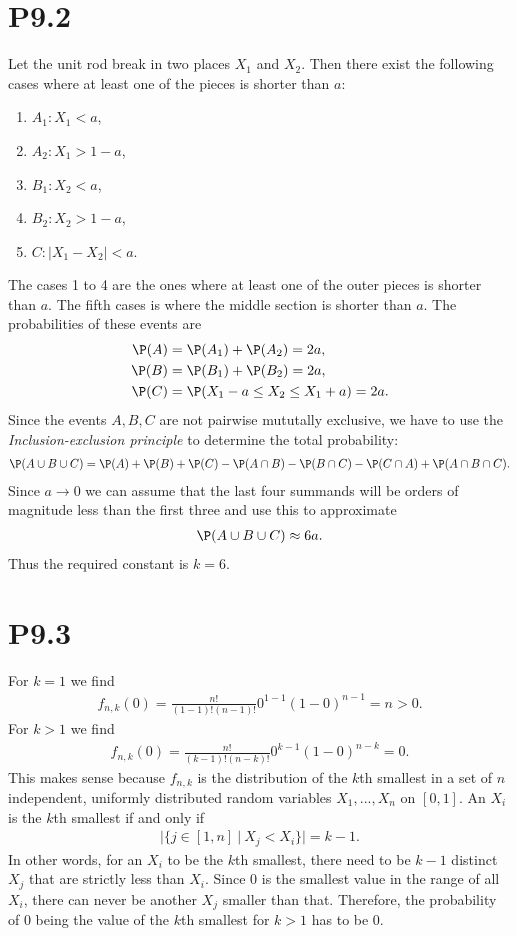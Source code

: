 \documentclass{article}
\begin{document}
\section*{P9.2}

Let the unit rod break in two places $X_1$ and $X_2$. Then there
exist the following cases where at least one of the pieces is shorter
than $a$:
\begin{enumerate}
  \item $A_1:X_1<a$,
  \item $A_2:X_1>1-a$,
  \item $B_1:X_2<a$,
  \item $B_2:X_2>1-a$,
  \item $C:|X_1-X_2|<a$.
\end{enumerate}
The cases 1 to 4 are the ones where at least one of the outer
pieces is shorter than $a$. The fifth cases is where the middle section 
is shorter than $a$. The probabilities of these events are
\begin{align*}
  \P(A) &= \P(A_1) + \P(A_2) = 2a,\\
  \P(B) &= \P(B_1) + \P(B_2) = 2a,\\
  \P(C) &= \P(X_1-a\leq X_2 \leq X_1+a) = 2a.
\end{align*}
Since the events $A,B,C$ are not pairwise mututally exclusive,
we have to use the \emph{Inclusion-exclusion principle}
to determine the total probability:
\begin{align*}
  \P(A\cup B\cup C) = \P(A) + \P(B) + \P(C) - \P(A \cap B) - \P(B\cap C) - \P(C\cap A) + \P(A\cap B\cap C).
\end{align*}
Since $a\to 0$ we can assume that the last four summands will be
orders of magnitude less than the first three and use this to approximate
\begin{align*}
  \P(A\cup B\cup C) \approx 6a.
\end{align*}
Thus the required constant is $k=6$.

\section*{P9.3}

For $k=1$ we find
\begin{align*}
  f_{n,k}(0) = \frac{n!}{(1-1)!(n-1)!}0^{1-1}(1-0)^{n-1} = n > 0.
\end{align*}
For $k>1$ we find
\begin{align*}
  f_{n,k}(0) = \frac{n!}{(k-1)!(n-k)!}0^{k-1}(1-0)^{n-k} = 0.
\end{align*}
This makes sense because $f_{n,k}$ is the distribution of 
the $k$th smallest in a set of $n$ independent, uniformly distributed
random variables $X_1, ..., X_n$ on $[0,1]$. 
An $X_i$ is the $k$th smallest if and only if 
\begin{align*}
  |\{j \in [1,n]\:|\: X_j < X_i\}| = k-1.
\end{align*} In other words, for an $X_i$ to be
the $k$th smallest, there need to be $k-1$ distinct $X_j$ that are strictly 
less than $X_i$. Since $0$ is the smallest value in the range of
all $X_i$, there can never be another $X_j$ smaller than that.
Therefore, the probability of $0$ being the value of the $k$th smallest
for $k>1$ has to be $0$.
\end{document}
